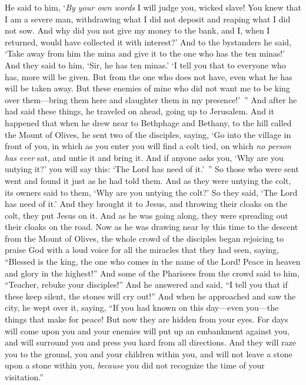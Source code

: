 \begin{biblechapter}
\verse He said to him, ‘\textit{By your own words} I will judge you, wicked slave! You knew that I am a severe man, withdrawing what I did not deposit and reaping what I did not sow.
\verse And why did you not give my money to the bank, and I, when I returned, would have collected it with interest?’
\verse And to the bystanders he said, ‘Take away from him the mina and give it to the one who has the ten minas!’
\verse And they said to him, ‘Sir, he has ten minas.’
\verse ‘I tell you that to everyone who has, more will be given. But from the one who does not have, even what he has will be taken away.
\verse But these enemies of mine who did not want me to be king over them—bring them here and slaughter them in my presence!’ ”
 And after he had said these things, he traveled on ahead, going up to Jerusalem.
\verse And it happened that when he drew near to Bethphage and Bethany, to the hill called the Mount of Olives, he sent two of the disciples,
\verse saying, ‘Go into the village in front of you, in which as you enter you will find a colt tied, on which \textit{no person has ever} sat, and untie it and bring it.
\verse And if anyone asks you, ‘Why are you untying it?’ you will say this: ‘The Lord has need of it.’ ”
\verse So those who were sent went and found it just as he had told them.
\verse And as they were untying the colt, its owners said to them, ‘Why are you untying the colt?’
\verse So they said, ‘The Lord has need of it.’
\verse And they brought it to Jesus, and throwing their cloaks on the colt, they put Jesus on it.
\verse And as he was going along, they were spreading out their cloaks on the road.
\verse Now as he was drawing near by this time to the descent from the Mount of Olives, the whole crowd of the disciples began rejoicing to praise God with a loud voice for all the miracles that they had seen,
\verse saying, “Blessed is the king, 
the one who comes in the name of the Lord! 
Peace in heaven 
and glory in the highest!”
\verse And some of the Pharisees from the crowd said to him, “Teacher, rebuke your disciples!”
\verse And he answered and said, “I tell you that if these keep silent, the stones will cry out!”
 And when he approached and saw the city, he wept over it,
\verse saying, “If you had known on this day—even you—the things that make for peace! But now they are hidden from your eyes.
\verse For days will come upon you and your enemies will put up an embankment against you, and will surround you and press you hard from all directions.
\verse And they will raze you to the ground, you and your children within you, and will not leave a stone upon a stone within you, \textit{because} you did not recognize the time of your visitation.”

\end{biblechapter}
